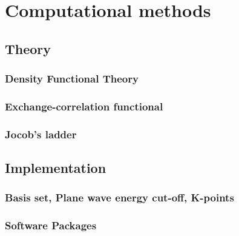 
\chapter{Computational methods}

\ifpdf
    \graphicspath{{Chapter2/Figs/Raster/}{Chapter2/Figs/PDF/}{Chapter2/Figs/}}
\else
    \graphicspath{{Chapter2/Figs/Vector/}{Chapter2/Figs/}}
\fi

\section{Theory}
\subsection{Density Functional Theory}
\subsection{Exchange-correlation functional}
\subsection{Jocob's ladder}
\section{Implementation}
\subsection{Basis set, Plane wave energy cut-off, K-points}
\subsection{Software Packages}